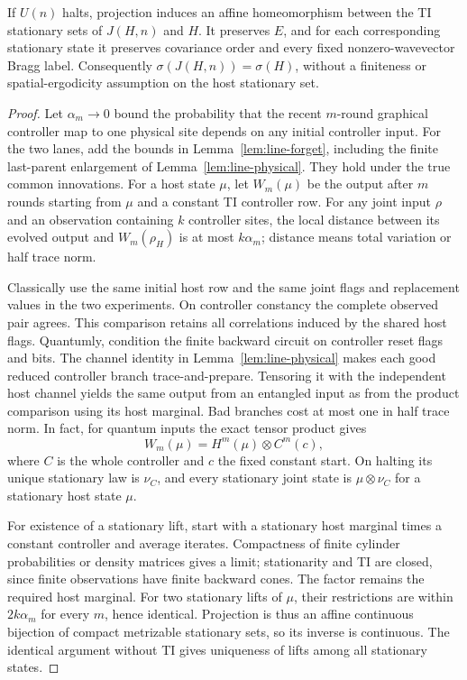 \begin{proposition}\label{prop:line-preserve}
If $U(n)$ halts, projection induces an affine homeomorphism between
the TI stationary sets of $J(H,n)$ and $H$. It preserves $E$, and for
each corresponding stationary state it preserves covariance order
and every fixed nonzero-wavevector Bragg label. Consequently
$\sigma(J(H,n))=\sigma(H)$, without a finiteness or spatial-ergodicity
assumption on the host stationary set.
\end{proposition}
\begin{proof}
Let $\alpha_m\to0$ bound the probability that the recent $m$-round
graphical controller map to one physical site depends on any initial
controller input. For the two lanes, add the bounds in
Lemma~\ref{lem:line-forget}, including the finite last-parent
enlargement of Lemma~\ref{lem:line-physical}. They hold under the true
common innovations.
For a host state $\mu$, let $W_m(\mu)$ be the output after $m$ rounds
starting from $\mu$ and a constant TI controller row.
For any joint input $\rho$ and an observation containing $k$
controller sites, the local distance between its evolved output and
$W_m(\rho_H)$ is at most $k\alpha_m$; distance means total variation
or half trace norm.

Classically use the same initial host row and the same joint flags
and replacement values in the two experiments. On controller
constancy the complete observed pair agrees. This comparison retains
all correlations induced by the shared host flags. Quantumly,
condition the finite backward circuit on controller reset flags
and bits. The channel identity in Lemma~\ref{lem:line-physical} makes
each good reduced controller branch trace-and-prepare. Tensoring
it with the independent host channel yields the same output from
an entangled input as from the product comparison using its host
marginal. Bad branches cost at most one in half trace norm. In fact,
for quantum inputs the exact tensor product gives
\[
 W_m(\mu)=H^m(\mu)\otimes C^m(c),
\]
where $C$ is the whole controller and $c$ the fixed constant start.
On halting its unique stationary law is $\nu_C$, and every stationary
joint state is $\mu\otimes\nu_C$ for a stationary host state $\mu$.

For existence of a stationary lift, start with a stationary host
marginal times a constant controller and average iterates. Compactness
of finite cylinder probabilities or density matrices gives a limit;
stationarity and TI are closed, since finite observations have finite
backward cones. The factor remains the required host marginal.
For two stationary lifts of $\mu$, their restrictions are within
$2k\alpha_m$ for every $m$, hence identical. Projection is thus an
affine continuous bijection of compact metrizable stationary sets,
so its inverse is continuous. The identical argument without TI gives
uniqueness of lifts among all stationary states.


\end{proof}
